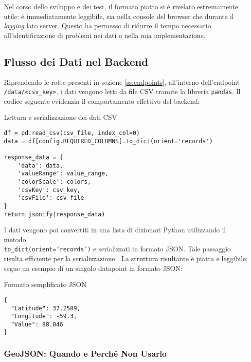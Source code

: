 Nel corso dello sviluppo e dei test, il formato piatto si è rivelato estremamente utile: è immediatamente leggibile, sia nella console del browser che durante il \textit{logging} lato server. Questo ha permesso di ridurre il tempo necessario all'identificazione di problemi nei dati o nella mia implementazione.


\subsection{Flusso dei Dati nel Backend}

Riprendendo le rotte presenti in sezione \ref{ss:endpoints}, all'interno dell'endpoint \texttt{/data/<csv\_key>}, i dati vengono letti da file CSV tramite la libreria \texttt{pandas}. Il codice seguente evidenzia il comportamento effettivo del backend:

\begin{listing}[H]
\caption{Lettura e serializzazione dei dati CSV}
\label{lst:csv_reading_serialization} %
\begin{verbatim}
df = pd.read_csv(csv_file, index_col=0)
data = df[config.REQUIRED_COLUMNS].to_dict(orient='records')

response_data = {
    'data': data,
    'valueRange': value_range,
    'colorScale': colors,
    'csvKey': csv_key,
    'csvFile': csv_file
}
return jsonify(response_data)
\end{verbatim}
\end{listing}

I dati vengono poi convertiti in una lista di dizionari Python utilizzando il metodo\\ \texttt{to\_dict(orient='records')} e serializzati in formato JSON. Tale passaggio risulta efficiente per la serializzazione \cite{pandas-todict}. La struttura risultante è piatta e leggibile; segue un esempio di un singolo datapoint in formato JSON:

\begin{listing}[H]
\caption{Formato semplificato JSON}
\label{lst:simplified_json_format} %
\begin{verbatim}
{
  "Latitude": 37.2589,
  "Longitude": -59.3,
  "Value": 88.046
}
\end{verbatim}
\end{listing}

\subsubsection{GeoJSON: Quando e Perché Non Usarlo}

